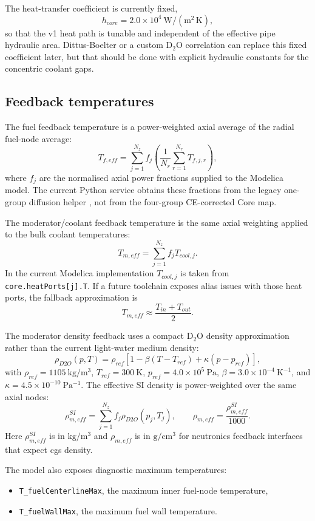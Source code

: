 \documentclass[11pt]{article}
\begin{document}
The heat-transfer coefficient is currently fixed,
\[
h_{core}=2.0\times 10^4\ \mathrm{W/(m^2\,K)},
\]
so that the v1 heat path is tunable and independent of the effective pipe
hydraulic area.  Dittus-Boelter or a custom D$_2$O correlation can replace
this fixed coefficient later, but that should be done with explicit hydraulic
constants for the concentric coolant gaps.

\subsection{Feedback temperatures}

The fuel feedback temperature is a power-weighted axial average of the
radial fuel-node average:
\[
T_{f,eff} = \sum_{j=1}^{N_z} f_j
  \left(\frac{1}{N_r}\sum_{r=1}^{N_r} T_{f,j,r}\right),
\]
where $f_j$ are the normalised axial power fractions supplied to the
Modelica model.  The current Python service obtains these fractions from the
legacy one-group diffusion helper
, not from the
four-group CE-corrected Core map.

The moderator/coolant feedback temperature is the same axial weighting
applied to the bulk coolant temperatures:
\[
T_{m,eff} = \sum_{j=1}^{N_z} f_j T_{cool,j}.
\]
In the current Modelica implementation $T_{cool,j}$ is taken from
\texttt{core.heatPorts[j].T}.  If a future toolchain exposes alias issues
with those heat ports, the fallback approximation is
\[
T_{m,eff} \approx \frac{T_{in}+T_{out}}{2}.
\]

The moderator density feedback uses a compact D$_2$O density approximation
rather than the current light-water medium density:
\[
\rho_{D2O}(p,T) = \rho_{ref}\left[1 - \beta(T-T_{ref})
  + \kappa(p-p_{ref})\right],
\]
with $\rho_{ref}=1105\ \mathrm{kg/m^3}$, $T_{ref}=300\ \mathrm{K}$,
$p_{ref}=4.0\times10^5\ \mathrm{Pa}$, $\beta=3.0\times10^{-4}\ \mathrm{K^{-1}}$,
and $\kappa=4.5\times10^{-10}\ \mathrm{Pa^{-1}}$.  The effective SI density
is power-weighted over the same axial nodes:
\[
\rho_{m,eff}^{SI} = \sum_{j=1}^{N_z} f_j\rho_{D2O}(p_j,T_j),
\qquad
\rho_{m,eff} = \frac{\rho_{m,eff}^{SI}}{1000}.
\]
Here $\rho_{m,eff}^{SI}$ is in $\mathrm{kg/m^3}$ and $\rho_{m,eff}$ is in
$\mathrm{g/cm^3}$ for neutronics feedback interfaces that expect cgs density.

The model also exposes diagnostic maximum temperatures:
\begin{itemize}
  \item \texttt{T\_fuelCenterlineMax}, the maximum inner fuel-node temperature,
  \item \texttt{T\_fuelWallMax}, the maximum fuel wall temperature.
\end{itemize}
\end{document}
